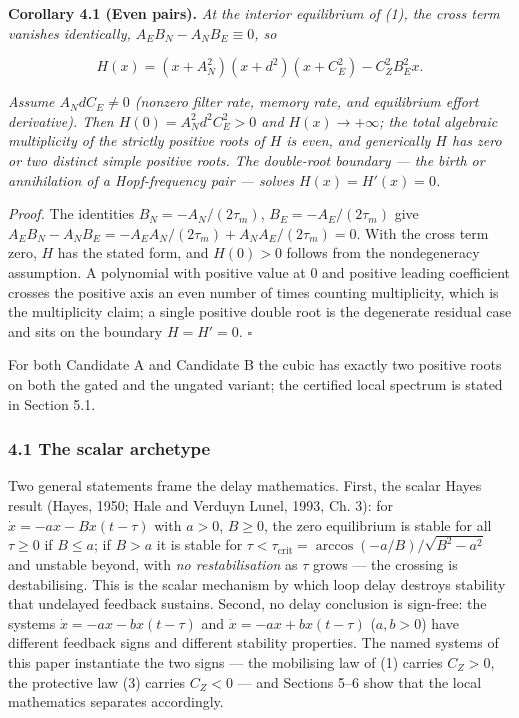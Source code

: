 \documentclass[11pt]{article}
\begin{document}
\textbf{Corollary 4.1 (Even pairs).} \emph{At the interior equilibrium
of (1), the cross term vanishes identically,
\(A_E B_N - A_N B_E \equiv 0\), so}

\[H(x) = (x + A_N^2)(x + d^2)(x + C_E^2) - C_Z^2 B_E^2 x.\]

\emph{Assume \(A_N d C_E \neq 0\) (nonzero filter rate, memory rate, and
equilibrium effort derivative). Then \(H(0) = A_N^2 d^2 C_E^2 > 0\) and
\(H(x) \to +\infty\); the total algebraic multiplicity of the strictly
positive roots of \(H\) is even, and generically \(H\) has zero or two
distinct simple positive roots. The double-root boundary --- the birth
or annihilation of a Hopf-frequency pair --- solves
\(H(x) = H'(x) = 0\).}

\emph{Proof.} The identities \(B_N = -A_N/(2\tau_m)\),
\(B_E = -A_E/(2\tau_m)\) give
\(A_E B_N - A_N B_E = -A_E A_N/(2\tau_m) + A_N A_E/(2\tau_m) = 0\). With
the cross term zero, \(H\) has the stated form, and \(H(0) > 0\) follows
from the nondegeneracy assumption. A polynomial with positive value at
\(0\) and positive leading coefficient crosses the positive axis an even
number of times counting multiplicity, which is the multiplicity claim;
a single positive double root is the degenerate residual case and sits
on the boundary \(H = H' = 0\). \ensuremath{\square}

For both Candidate A and Candidate B the cubic has exactly two positive
roots on both the gated and the ungated variant; the certified local
spectrum is stated in Section 5.1.

\subsubsection{4.1 The scalar archetype}\label{the-scalar-archetype}

Two general statements frame the delay mathematics. First, the scalar
Hayes result (Hayes, 1950; Hale and Verduyn Lunel, 1993, Ch. 3): for
\(\dot x = -ax - Bx(t-\tau)\) with \(a > 0\), \(B \ge 0\), the zero
equilibrium is stable for all \(\tau \ge 0\) if \(B \le a\); if
\(B > a\) it is stable for
\(\tau < \tau_{\mathrm{crit}} = \arccos(-a/B)/\sqrt{B^2 - a^2}\) and
unstable beyond, with \emph{no restabilisation} as \(\tau\) grows ---
the crossing is destabilising. This is the scalar mechanism by which
loop delay destroys stability that undelayed feedback sustains. Second,
no delay conclusion is sign-free: the systems
\(\dot x = -ax - bx(t-\tau)\) and \(\dot x = -ax + bx(t-\tau)\)
(\(a, b > 0\)) have different feedback signs and different stability
properties. The named systems of this paper instantiate the two signs
--- the mobilising law of (1) carries \(C_Z > 0\), the protective law
(3) carries \(C_Z < 0\) --- and Sections 5--6 show that the local
mathematics separates accordingly.
\end{document}
